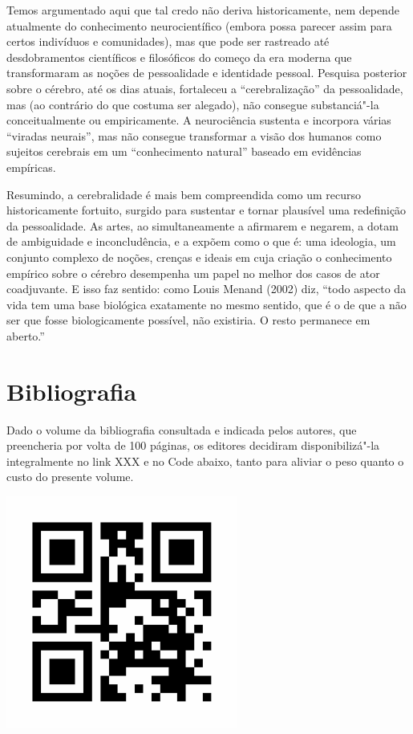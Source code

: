 Temos argumentado aqui que tal credo não deriva historicamente, nem
depende atualmente do conhecimento neurocientífico (embora possa parecer
assim para certos indivíduos e comunidades), mas que pode ser rastreado
até desdobramentos científicos e filosóficos do começo da era moderna
que transformaram as noções de pessoalidade e identidade pessoal.
Pesquisa posterior sobre o cérebro, até os dias atuais, fortaleceu a
``cerebralização'' da pessoalidade, mas (ao contrário do que costuma ser
alegado), não consegue substanciá"-la conceitualmente ou empiricamente. A
neurociência sustenta e incorpora várias ``viradas neurais'', mas não
consegue transformar a visão dos humanos como sujeitos cerebrais em um
``conhecimento natural'' baseado em evidências empíricas.

Resumindo, a cerebralidade é mais bem compreendida como um recurso
historicamente fortuito, surgido para sustentar e tornar plausível uma
redefinição da pessoalidade. As artes, ao simultaneamente a afirmarem e
negarem, a dotam de ambiguidade e inconcludência, e a expõem como o que
é: uma ideologia, um conjunto complexo de noções, crenças e ideais em
cuja criação o conhecimento empírico sobre o cérebro desempenha um papel
no melhor dos casos de ator coadjuvante. E isso faz sentido: como Louis
Menand (2002) diz, ``todo aspecto da vida tem uma base biológica
exatamente no mesmo sentido, que é o de que a não ser que fosse
biologicamente possível, não existiria. O resto permanece em aberto.''

\chapter{Bibliografia}

Dado o volume da bibliografia consultada e indicada pelos autores, que
preencheria por volta de 100 páginas, os editores decidiram disponibilizá"-la
integralmente no link XXX e no  Code abaixo, tanto para aliviar 
o peso quanto o custo do presente volume.

\begin{center}
\includegraphics[width=3in,height=3in]{imgs/qrcode.png}
\end{center}
